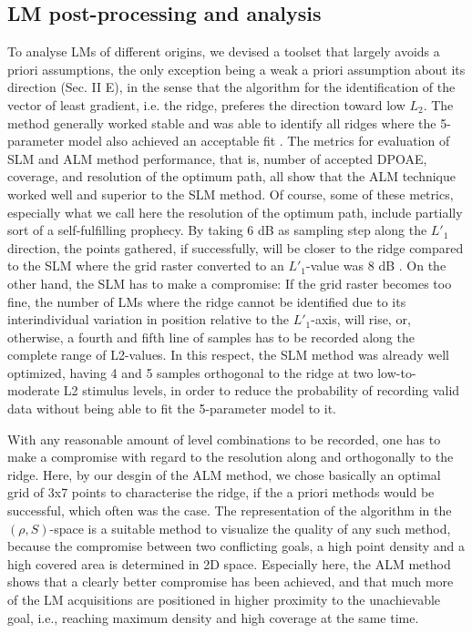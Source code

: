 \documentclass[journal,twoside,web]{ieeecolor2}
\begin{document}
\subsection{LM post-processing and analysis}
To analyse LMs of different origins, we devised a toolset that largely avoids a priori assumptions, the only exception being a weak a priori assumption about its direction (Sec. II E), in the sense that the algorithm for the identification of the vector of least gradient, i.e. the ridge, preferes the direction toward low $L_2$. The method generally worked stable and was able to identify all ridges where the 5-parameter model also achieved an acceptable fit . The metrics for evaluation of SLM and ALM method performance, that is, number of accepted DPOAE, coverage, and resolution of the optimum path, all show that the ALM technique worked well and superior to the SLM method. Of course, some of these metrics, especially what we call here the resolution of the optimum path, include partially sort of a self-fulfilling prophecy. By taking 6 dB as sampling step along the $L'_1$ direction, the points gathered, if successfully, will be closer to the ridge compared to the SLM where the grid raster converted to an $L'_1$-value was 8 dB . On the other hand, the SLM has to make a compromise: If the grid raster becomes too fine, the number of LMs where the ridge cannot be identified due to its interindividual variation in position relative to the $L'_1$-axis, will rise, or, otherwise, a fourth and fifth line of samples has to be recorded along the complete range of L2-values. In this respect, the SLM method was already well optimized, having 4 and 5 samples orthogonal to the ridge at two low-to-moderate L2 stimulus levels, in order to reduce the probability of recording valid data without being able to fit the 5-parameter model to it.

With any reasonable amount of  level combinations to be recorded, one has to make a compromise with regard to the resolution along and orthogonally to the ridge. Here, by our desgin of the ALM method, we chose basically an optimal grid of 3x7 points to characterise the ridge, if the a priori methods would be successful, which often was the case. The representation of the algorithm in the $(\rho, S)$-space is a suitable method to visualize the quality of any such method, because the compromise between two conflicting goals, a high point density and a high covered area is determined in 2D space. Especially here, the ALM method shows that a clearly better compromise has been achieved, and that much more of the LM acquisitions are positioned in higher proximity to the unachievable goal, i.e., reaching maximum density and high coverage at the same time.
\end{document}
